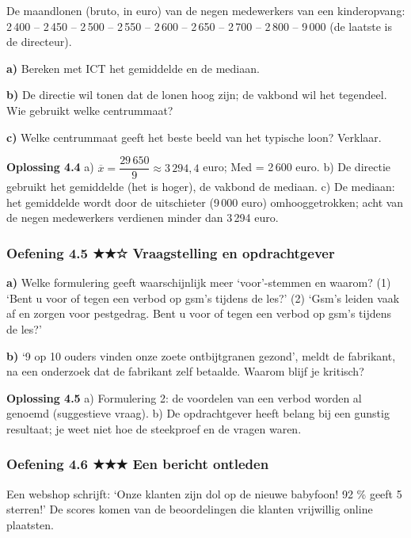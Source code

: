 De maandlonen (bruto, in euro) van de negen medewerkers van een kinderopvang: 2\,400 – 2\,450 – 2\,500 – 2\,550 – 2\,600 – 2\,650 – 2\,700 – 2\,800 – 9\,000 (de laatste is de directeur).

\textbf{a)} Bereken met ICT het gemiddelde en de mediaan. \lijn

\textbf{b)} De directie wil tonen dat de lonen hoog zijn; de vakbond wil het tegendeel. Wie gebruikt welke centrummaat? \lijn

\textbf{c)} Welke centrummaat geeft het beste beeld van het typische loon? Verklaar. \lijn

\begin{oplossing}
\textbf{Oplossing 4.4} \quad a) $\overline{x}=\dfrac{29\,650}{9}\approx 3\,294{,}4$ euro; Med = 2\,600 euro. b) De directie gebruikt het gemiddelde (het is hoger), de vakbond de mediaan. c) De mediaan: het gemiddelde wordt door de uitschieter (9\,000 euro) omhooggetrokken; acht van de negen medewerkers verdienen minder dan 3\,294 euro.
\end{oplossing}

\subsubsection*{Oefening 4.5 \quad ★★☆ \quad Vraagstelling en opdrachtgever}

\textbf{a)} Welke formulering geeft waarschijnlijk meer ‘voor’-stemmen en waarom? (1) ‘Bent u voor of tegen een verbod op gsm’s tijdens de les?’ (2) ‘Gsm’s leiden vaak af en zorgen voor pestgedrag. Bent u voor of tegen een verbod op gsm’s tijdens de les?’ \lijn

\textbf{b)} ‘9 op 10 ouders vinden onze zoete ontbijtgranen gezond’, meldt de fabrikant, na een onderzoek dat de fabrikant zelf betaalde. Waarom blijf je kritisch? \lijn

\begin{oplossing}
\textbf{Oplossing 4.5} \quad a) Formulering 2: de voordelen van een verbod worden al genoemd (suggestieve vraag). b) De opdrachtgever heeft belang bij een gunstig resultaat; je weet niet hoe de steekproef en de vragen waren.
\end{oplossing}

\subsubsection*{Oefening 4.6 \quad ★★★ \quad Een bericht ontleden}

Een webshop schrijft: ‘Onze klanten zijn dol op de nieuwe babyfoon! 92 \% geeft 5 sterren!’ De scores komen van de beoordelingen die klanten vrijwillig online plaatsten.

